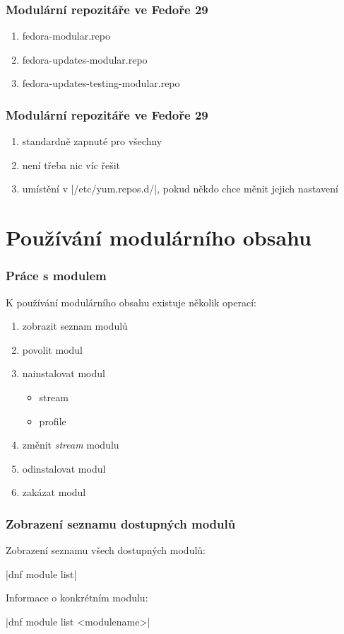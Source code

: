 \documentclass[12pt]{beamer}
\begin{document}
\begin{frame}
\frametitle{Modulární repozitáře ve Fedoře 29}

\begin{enumerate}
	\item fedora-modular.repo
	\item fedora-updates-modular.repo
	\item fedora-updates-testing-modular.repo
\end{enumerate}
\end{frame}

\begin{frame}[fragile]
\frametitle{Modulární repozitáře ve Fedoře 29}

\begin{enumerate}
	\item standardně zapnuté pro všechny
	\item není třeba nic víc řešit
 	\item umístění v \tc|/etc/yum.repos.d/|, pokud někdo chce měnit jejich nastavení
\end{enumerate}
\end{frame}

\section{Používání modulárního obsahu}

\begin{frame}
\frametitle{Práce s modulem}

K používání modulárního obsahu existuje několik operací:

\begin{enumerate}
	\item zobrazit seznam modulů
	\item povolit modul
	\item nainstalovat modul
	\begin{itemize}
		\item stream
		\item profile
	\end{itemize}
	\item změnit \textit{stream} modulu
	\item odinstalovat modul
	\item zakázat modul
\end{enumerate}
\end{frame}

\begin{frame}[fragile]
\frametitle{Zobrazení seznamu dostupných modulů}

Zobrazení seznamu všech dostupných modulů:

\begin{center}
	\tc|dnf module list|
\end{center}

Informace o konkrétním modulu:

\begin{center}
	\tc|dnf module list <modulename>|
\end{center}
\end{frame}
\end{document}
